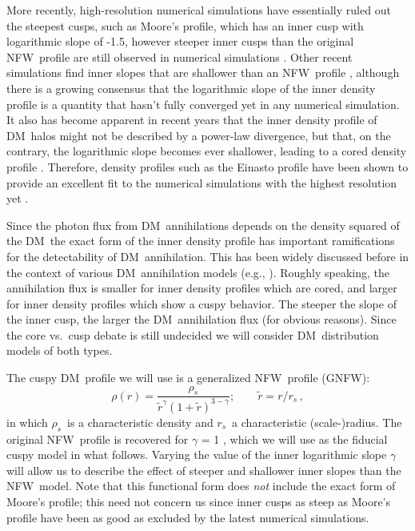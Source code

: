 \documentclass[aps,prd,twocolumn,amsmath,amssymb,floatfix,nofootinbib,10pt]{revtex4}
\newcommand{\eg}{e.g.}
\newcommand{\NFW}{NFW}
\newcommand{\GNFW}{G\NFW}
\newcommand{\DM}{DM}
\newcommand{\redr}{\ensuremath{\tilde{r}}}
\newcommand{\rhos}{\ensuremath{\rho_s}}
\newcommand{\rs}{\ensuremath{r_s}}
\begin{document}
More recently, high-resolution numerical simulations have essentially
ruled out the steepest cusps, such as Moore's profile, which has an
inner cusp with logarithmic slope of -1.5, however steeper inner cusps
than the original \NFW\ profile are still observed in numerical
simulations \cite{2005MNRAS.364..665D}. Other recent simulations find
inner slopes that are shallower than an \NFW\ profile
\cite{2008MNRAS.385..545K,2008arXiv0808.2981S,2008arXiv0810.1522N},
although there is a growing consensus that the logarithmic slope of
the inner density profile is a quantity that hasn't fully converged
yet in any numerical simulation. It also has become apparent in recent
years that the inner density profile of \DM\ halos might not be
described by a power-law divergence, but that, on the contrary, the
logarithmic slope becomes ever shallower, leading to a cored density
profile
\cite{2004MNRAS.349.1039N,2005ApJ...624L..85M,2006AJ....132.2685M,2006AJ....132.2701G,2006MNRAS.365..147S,2008arXiv0808.2981S,2008MNRAS.391.1685S,2008arXiv0810.1522N}. Therefore,
density profiles such as the Einasto profile
\cite{einasto65a,1989A&A...223...89E} have been shown to provide an
excellent fit to the numerical simulations with the highest resolution
yet \cite{2008MNRAS.391.1685S,2008arXiv0808.2981S}.

Since the photon flux from \DM\ annihilations depends on the density
squared of the \DM\, the exact form of the inner density profile has
important ramifications for the detectability of \DM\
annihilation. This has been widely discussed before in the context of
various \DM\ annihilation models (\eg,
\cite{1998APh.....9..137B,1999PhRvL..83.1719G,2000PhRvD..62l3005C,2000PhLB..494..181G,2002PhRvD..66b3509T,2002PhRvD..66l3502U,2003MNRAS.339..505T,2004ApJ...601...47A,2008JCAP...07..013B,2008arXiv0811.3744B,2008arXiv0812.3895B}). Roughly
speaking, the annihilation flux is smaller for inner density profiles
which are cored, and larger for inner density profiles which show a
cuspy behavior. The steeper the slope of the inner cusp, the larger
the \DM\ annihilation flux (for obvious reasons). Since the core
vs.~cusp debate is still undecided we will consider \DM\ distribution
models of both types.

The cuspy \DM\ profile we will use is a generalized \NFW\ profile (\GNFW):
\begin{equation}\label{eq:NFW}
\rho(r) = \frac{\rhos}{\redr^\gamma\left(1+\redr\right)^{3-\gamma}};\qquad \redr = r/\rs\, ,
\end{equation}
in which \rhos\ is a characteristic density and \rs\ a characteristic
(scale-)radius.  The original \NFW\ profile is recovered for $\gamma$
= 1 \cite{1997ApJ...490..493N}, which we will use as the fiducial
cuspy model in what follows. Varying the value of the inner
logarithmic slope $\gamma$ will allow us to describe the effect of
steeper and shallower inner slopes than the \NFW\ model. Note that
this functional form does \emph{not} include the exact form of Moore's
profile; this need not concern us since inner cusps as steep as
Moore's profile have been as good as excluded by the latest numerical
simulations.
\end{document}
